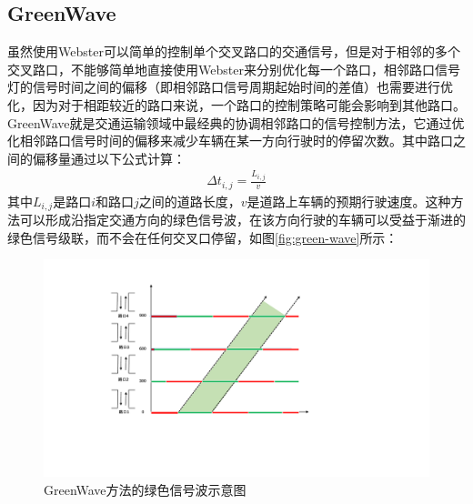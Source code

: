 \subsection{GreenWave}
虽然使用Webster可以简单的控制单个交叉路口的交通信号，但是对于相邻的多个交叉路口，不能够简单地直接使用Webster来分别优化每一个路口，相邻路口信号灯的信号时间之间的偏移（即相邻路口信号周期起始时间的差值）也需要进行优化，因为对于相距较近的路口来说，一个路口的控制策略可能会影响到其他路口。
GreenWave\cite{roess2004traffic}就是交通运输领域中最经典的协调相邻路口的信号控制方法，它通过优化相邻路口信号时间的偏移来减少车辆在某一方向行驶时的停留次数。其中路口之间的偏移量通过以下公式计算：
\begin{align}
    \label{eq:green-wave}
    \Delta t_{i, j}=\frac{L_{i, j}}{v}
\end{align}
其中$L_{i, j}$是路口$i$和路口$j$之间的道路长度，$v$是道路上车辆的预期行驶速度。这种方法可以形成沿指定交通方向的绿色信号波，在该方向行驶的车辆可以受益于渐进的绿色信号级联，而不会在任何交叉口停留，如图\autoref{fig:green-wave}所示：
\begin{figure}[htb]
    \includegraphics[width=1.2\textwidth]{fig/green-ware.pdf}
    \caption{GreenWave方法的绿色信号波示意图}
    \label{fig:green-wave}
\end{figure}

